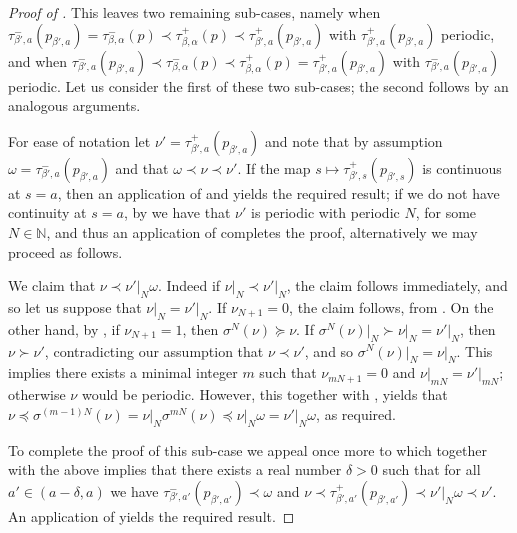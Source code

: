 \documentclass[a4paper,reqno,10pt]{amsart}
\begin{document}
\begin{proof}[{Proof of }]
This leaves two remaining sub-cases, namely when $\tau_{\beta', a}^{-}(p_{\beta',a}) = \tau_{\beta, \alpha}^{-}(p) \prec \tau_{\beta, \alpha}^{+}(p) \prec \tau_{\beta', a}^{+}(p_{\beta', a})$ with $\tau_{\beta', a}^{+}(p_{\beta', a})$ periodic, and when $\tau_{\beta', a}^{-}(p_{\beta',a}) \prec \tau_{\beta, \alpha}^{-}(p) \prec \tau_{\beta, \alpha}^{+}(p) = \tau_{\beta', a}^{+}(p_{\beta', a})$ with $\tau_{\beta', a}^{-}(p_{\beta', a})$ periodic. Let us consider the first of these two sub-cases; the second follows by an analogous arguments.

For ease of notation let $\nu' = \tau_{\beta', a}^{+}(p_{\beta',a})$ and note that by assumption $\omega = \tau_{\beta', a}^{-}(p_{\beta',a})$ and that $\omega \prec \nu \prec \nu'$.  If the map $s \mapsto \tau_{\beta', s}^{+}(p_{\beta',s})$ is continuous at $s = a$, then an application of  and  yields the required result; if we do not have continuity at $s = a$, by  we have that $\nu'$ is periodic with periodic $N$, for some $N \in \mathbb{N}$, and thus an application of  completes the proof, alternatively we may proceed as follows.

We claim that $\nu \prec \nu'\vert_{N}\omega$. Indeed if $\nu\vert_{N} \prec \nu'\vert_{N}$, the claim follows immediately, and so let us suppose that $\nu\vert_{N} = \nu'\vert_{N}$.  If $\nu_{N+1} = 0$, the claim follows, from .  On the other hand, by , if $\nu_{N+1} = 1$, then $\sigma^{N}(\nu) \succeq \nu$.  If $\sigma^{N}(\nu)\vert_{N} \succ \nu\vert_{N} = \nu'\vert_{N}$, then $\nu \succ \nu'$, contradicting our assumption that $\nu \prec \nu'$, and so  $\sigma^{N}(\nu)\vert_{N} = \nu\vert_{N}$. This implies there exists a minimal integer $m$ such that $\nu_{m N + 1} = 0$ and $\nu\vert_{mN} = \nu'\vert_{mN}$; otherwise $\nu$ would be periodic. However, this together with , yields that $\nu \preceq \sigma^{(m-1)N}(\nu) = \nu\vert_{N}\sigma^{mN}(\nu) \preceq \nu\vert_{N}\omega = \nu'\vert_{N}\omega$, as required. 

To complete the proof of this sub-case we appeal once more to  which together with the above implies that there exists a real number $\delta > 0$ such that for all $a' \in (a-\delta,a)$ we have $\tau_{\beta',a'}^{-}(p_{\beta',a'}) \prec \omega$ and $\nu \prec \tau_{\beta',a'}^{+}(p_{\beta',a'}) \prec \nu'\vert_{N}\omega \prec \nu'$. An application of  yields the required result.
\end{proof}
\end{document}
